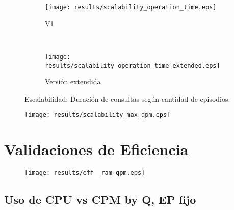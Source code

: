 \begin{figure}[H]
	\centering
	\begin{subfigure}[b]{0.65\textwidth}
		\texttt{[image: results/scalability\_operation\_time.eps]}
		\caption{V1}
		\label{fig:gull}
	\end{subfigure}
	~
	\begin{subfigure}[b]{0.65\textwidth}
		\texttt{[image: results/scalability\_operation\_time\_extended.eps]}
		\caption{Versión extendida}
		\label{fig:tiger}
	\end{subfigure}
	\caption[Escalabilidad: Duración de consultas según cantidad de episodios.]
	{\small Escalabilidad: Duración de consultas según cantidad de episodios.}\label{fig:animals}
\end{figure}

\begin{figure}[H]
	\centering
	\texttt{[image: results/scalability\_max\_qpm.eps]}
	\caption[]
	{\small }
	\label{img:result_scalability_max_qpm}
\end{figure}


\section{Validaciones de Eficiencia}

\begin{figure}[H]
	\centering
	\texttt{[image: results/eff\_\_ram\_qpm.eps]}
	\caption[]
	{\small }
	\label{img:result_eff__ram_qpm}
\end{figure}

\subsection{Uso de CPU vs CPM by Q, EP fijo}

